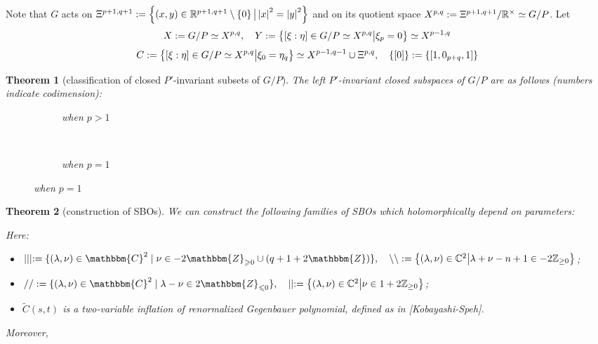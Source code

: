 \documentclass[10pt]{article} %
\newcommand{\assign}{:=}
\newtheorem{theorem}{Theorem}
\theoremstyle{definition}
\begin{document}
Note that $G$ acts on $\Xi^{p+1,q+1}:=\left\{(x,y)\in\mathbb{R}^{p+1,q+1}\setminus\left\{ 0 \right\}\big| \left|x\right|^2=\left|y\right|^2\right\}$ and on its quotient space
$X^{p,q}:=\Xi^{p+1,q+1}/\mathbb{R}^{\times}\simeq G/P$. Let
\[
	X:=G/P\simeq X^{p,q},\quad Y:=\left\{[\xi:\eta]\in G/P\simeq X^{p,q}\big| \xi_{p}=0\right\}\simeq X^{p-1,q}\]
	\[C:=\left\{[\xi:\eta]\in G/P\simeq X^{p,q}\big| \xi_{0}=\eta_q\right\}\simeq X^{p-1,q-1}\cup\Xi^{p,q},\quad\left\{ [0] \right\}:=\left\{ [1,0_{p+q},1] \right\}\]
\begin{theorem}[classification of closed $P'$-invariant subsets of $G/P$]
	The left $P'$-invariant closed subspaces of $G/P$ are as follows (numbers indicate codimension):\\
  \begin{figure}[H]
    \centering
    \begin{subfigure}[t]{0.3\textwidth}
	    \xymatrixrowsep{0.5pc}
	\caption{when $p>1$}
    \end{subfigure}
    ~ %
    \begin{subfigure}[t]{0.3\textwidth}
	    \xymatrixrowsep{0.5pc}
	    {}
	\caption{when $p=1$}
    \end{subfigure}
\end{figure}
\end{theorem}
\begin{theorem}[construction of SBOs]
We can construct the following families of SBOs which holomorphically depend on parameters:\\

Here:
\begin{itemize}
	\item $\mid \mid \mid \assign \{ (\lambda, \nu) \in \mathbbm{C}^2 \mid \nu \in
	- 2\mathbbm{Z}_{\geqslant 0} \cup (q + 1 + 2\mathbbm{Z}) \},\quad \backslash\backslash:=\mysetn{(\lambda,\nu)\in\C^2}{\lambda+\nu-n+1\in-2\Z_{\ge0}}$;
\item $/ / \assign
\{ (\lambda, \nu) \in \mathbbm{C}^2 \mid \lambda - \nu \in
2\mathbbm{Z}_{\leqslant 0} \},\quad \mid\mid:=\mysetn{(\lambda,\nu)\in\C^2}{\nu\in1+2\Z_{\ge0}}$;
\item $\tilde{C}(s,t)$ is a two-variable inflation of renormalized Gegenbauer polynomial, defined as in [Kobayashi-Speh].
\end{itemize}
Moreover,\\
\end{theorem}
\end{document}
